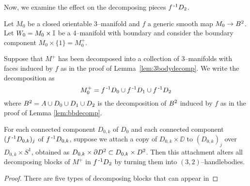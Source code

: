 Now, we examine the effect on the decomposing pieces $f^{\,\text{-}1} D_2$.

\begin{lem}
	\label{lem:3body2handlept2}
	Let $M_0$ be a closed orientable 3--manifold and $f$ a generic smooth map $M_0\to B^2$.
	Let $W_0=M_0\times\mathbb{I}$ be a 4--manifold with boundary and consider the boundary component $M_0\times\{1\}=M_0^+$.
	
	Suppose that $M^+$ has been decomposed into a collection of 3--manifolds with faces induced by $f$ as in the proof of Lemma~\ref{lem:3bodydecomp}.
	We write the decomposition as
	\[
		M_0^+ = f^{\,\text{-}1} D_0\cup f^{\,\text{-}1} D_1\cup f^{\,\text{-}1} D_2
	\]
	where $B^2=A\cup D_0\cup D_1\cup D_2$ is the decomposition of $B^2$ induced by $f$ as in the proof of Lemma \ref{lem:bbdecomp}.
	
	For each connected component $D_{0,k}$ of $D_0$ and each connected component $(f^{\,\text{-}1} D_{0,k})_j$ of $f^{\,\text{-}1} D_{0,k}$, suppose we attach a copy of $D_{0,k}\times\DD$ to $(D_{0,k})_j$ over $D_{0,k}\times S^1$, obtained as $D_{0,k}\times \partial D^2\subset D_{0,k}\times D^2$.
	Then this attachment alters all decomposing blocks of $M^+$ in $f^{\,\text{-}1} D_2$ by turning them into $(3,2)$--handlebodies.
\end{lem}

\begin{proof}
	There are five types of decomposing blocks that can appear in 
	
	
\end{proof}


